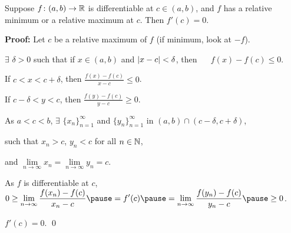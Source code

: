 \documentclass[10pt,aspectratio=169]{beamer}
\begin{document}
\begin{frame}

\begin{lemma}
Suppose $f \colon (a,b) \to {\mathbb{R}}$ is differentiable at $c \in (a,b)$,
and $f$ has
a relative minimum or a relative maximum at $c$.  Then
$f'(c) = 0$.
\end{lemma}

\pause
\textbf{Proof:}
Let $c$ be a relative maximum of $f$ \quad (if minimum, look at $-f$).

\pause
\medskip

$\exists$ $\delta > 0$ such that 
if $x \in (a,b)$ and $\left\lvert {x-c} \right\rvert < \delta$, then ~~
$f(x)-f(c) \leq 0$.

\pause
\medskip

If $c < x < c+\delta$, then
$\displaystyle
\frac{f(x)-f(c)}{x-c} \leq 0$.

\pause
\medskip

If $c-\delta < y < c$, then
$\displaystyle
\frac{f(y)-f(c)}{y-c} \geq 0$.

\pause
\medskip

As $a < c < b$, $\exists$
$\{ x_n \}_{n=1}^\infty$ and
$\{ y_n \}_{n=1}^\infty$ in $(a,b) \cap (c-\delta,c+\delta)$,

\pause
such that $x_n > c$, $y_n < c$ for all $n \in {\mathbb{N}}$,

\pause
and
$\lim\limits_{n\to\infty} x_n = \lim\limits_{n\to\infty} y_n = c$.


\pause
As $f$
is differentiable at $c$,
\quad
$\displaystyle
0 \geq \lim_{n\to\infty} \frac{f(x_n)-f(c)}{x_n-c} 
\pause
=
f'(c)
\pause
=
\lim_{n\to\infty} \frac{f(y_n)-f(c)}{y_n-c}
\pause
\geq 0$.

\pause
\medskip

\thus \quad $f'(c) = 0$.
\qed

\end{frame}
\end{document}
